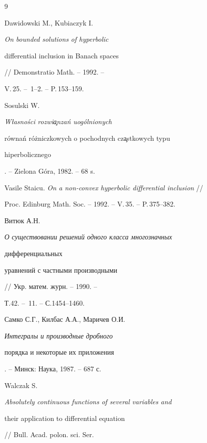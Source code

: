 \begin{thebibliography}{9} 


 




Dawidowski M., Kubiaczyk I. {\em On bounded solutions of hyperbolic 


differential inclusion in Banach spaces} // Demonstratio Math. -- 1992. -- 


V.\,25. -- \No\,1--2. -- P.\,153--159. 


 




Sosulski W. {\em W\l{}asno\'sci rozwi\c{a}nza\'n uog\'olnionych 


r\'owna\'n r\'o\.{z}niczkowych o pochodnych cz\c{a}stkowych typu 


hiperbolicznego}. -- Zielona G\'ora, 1982. -- 68 s. 


 




Vasile Staicu. {\em On a non-convex hyperbolic differential inclusion} // 


Proc. Edinburg Math. Soc. -- 1992. -- V.\,35. -- P.\,375--382. 


 




Витюк А.Н. {\em О существовании решений одного класса многозначных 


дифференциальных 


уравнений с частными производными} // Укр. матем. журн. -- 1990. -- 


Т.42. -- \No\,11. -- С.1454--1460. 


 




Самко С.Г., Килбас А.А., Маричев О.И. {\em Интегралы и производные дробного 


порядка и некоторые их приложения}. -- Минск: Наука, 1987. -- 687 с. 


 




Walczak S. {\em Absolutely continuous functions of several variables and 


their application to differential equation} // Bull. Acad. polon. sci. Ser. 



\end{thebibliography}
